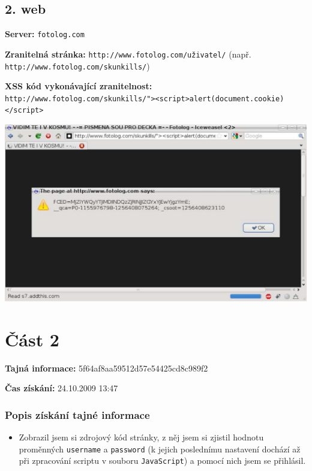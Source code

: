 \documentclass[a4paper,10pt]{article}
\begin{document}
\subsection*{2. web}

\textbf{Server:} \verb!fotolog.com!

\textbf{Zranitelná stránka:} \verb!http://www.fotolog.com/uživatel/! (např. \verb!http://www.fotolog.com/skunkills/!)

\textbf{XSS kód vykonávající zranitelnost:} \\
\verb!http://www.fotolog.com/skunkills/"><script>alert(document.cookie)</script>!

\begin{center}
	\includegraphics[width=14cm,keepaspectratio]{include/xss2}
\end{center}

\section*{Část 2}

\textbf{Tajná informace:} 5f64af8aa59512d57e54425cd8c989f2

\textbf{Čas získání:} 24.10.2009 13:47

\subsubsection*{Popis získání tajné informace}

\begin{itemize}
	\item Zobrazil jsem si zdrojový kód stránky, z něj jsem si zjistil hodnotu proměnných
	\texttt{username} a \texttt{password} (k jejich poslednímu nastavení dochází až
	při zpracování scriptu v souboru \texttt{JavaScript}) a pomocí nich jsem se
	přihlásil.
\end{itemize}
\end{document}
